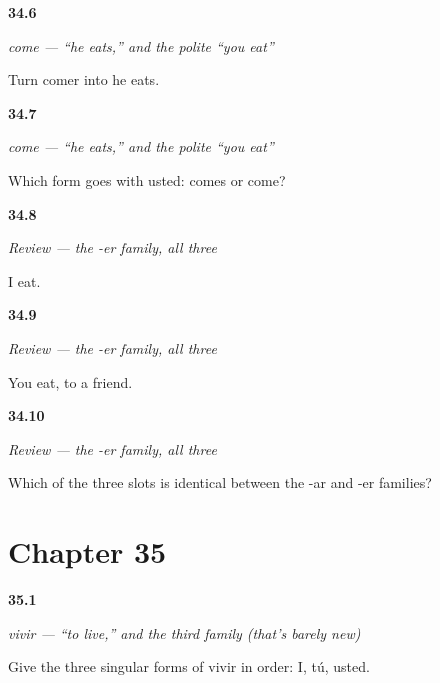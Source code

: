 \noindent\begin{minipage}[t]{\linewidth}
\raggedright
\hypertarget{review-ES-C07-come-form}{\textbf{34.6}} \emph{come — \textquotedblleft{}he eats,\textquotedblright{} and the polite \textquotedblleft{}you eat\textquotedblright{}}\par
\small Turn comer into he eats.
\end{minipage}\par\medskip

\noindent\begin{minipage}[t]{\linewidth}
\raggedright
\hypertarget{review-ES-C07-come-usted}{\textbf{34.7}} \emph{come — \textquotedblleft{}he eats,\textquotedblright{} and the polite \textquotedblleft{}you eat\textquotedblright{}}\par
\small Which form goes with usted: comes or come?
\end{minipage}\par\medskip

\noindent\begin{minipage}[t]{\linewidth}
\raggedright
\hypertarget{review-ES-C07-repaso-comer-i}{\textbf{34.8}} \emph{Review — the -er family, all three}\par
\small I eat.
\end{minipage}\par\medskip

\noindent\begin{minipage}[t]{\linewidth}
\raggedright
\hypertarget{review-ES-C07-repaso-comer-you}{\textbf{34.9}} \emph{Review — the -er family, all three}\par
\small You eat, to a friend.
\end{minipage}\par\medskip

\noindent\begin{minipage}[t]{\linewidth}
\raggedright
\hypertarget{review-ES-C07-repaso-comer-diff}{\textbf{34.10}} \emph{Review — the -er family, all three}\par
\small Which of the three slots is identical between the -ar and -er families?
\end{minipage}\par\medskip

\section*{Chapter 35}

\noindent\begin{minipage}[t]{\linewidth}
\raggedright
\hypertarget{review-ES-C07-vivir-singular-forms}{\textbf{35.1}} \emph{vivir — \textquotedblleft{}to live,\textquotedblright{} and the third family (that's barely new)}\par
\small Give the three singular forms of vivir in order: I, tú, usted.
\end{minipage}\par\medskip

